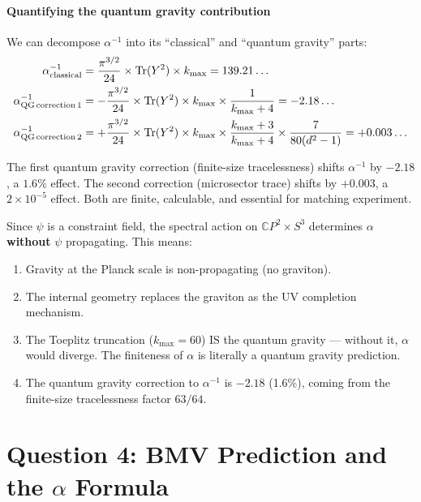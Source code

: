 \documentclass[12pt,a4paper]{article}
\newcommand{\Tr}{\operatorname{Tr}}
\newcommand{\CP}{\mathbb{C}P}
\begin{document}
\subsection{Quantifying the quantum gravity contribution}

We can decompose $\alpha^{-1}$ into its ``classical'' and ``quantum gravity'' parts:
\begin{align}
\alpha^{-1}_{\rm classical} &= \frac{\pi^{3/2}}{24} \times \Tr(Y^2) \times k_{\max} = 139.21\ldots \\
\alpha^{-1}_{\rm QG\,correction\,1} &= -\frac{\pi^{3/2}}{24} \times \Tr(Y^2) \times k_{\max} \times \frac{1}{k_{\max}+4} = -2.18\ldots \\
\alpha^{-1}_{\rm QG\,correction\,2} &= +\frac{\pi^{3/2}}{24} \times \Tr(Y^2) \times k_{\max} \times \frac{k_{\max}+3}{k_{\max}+4} \times \frac{7}{80(d^2-1)} = +0.003\ldots
\end{align}

The first quantum gravity correction (finite-size tracelessness) shifts $\alpha^{-1}$ by $-2.18$, a $1.6\%$ effect. The second correction (microsector trace) shifts by $+0.003$, a $2 \times 10^{-5}$ effect. Both are finite, calculable, and essential for matching experiment.

\begin{tcolorbox}[colback=blue!5!white, colframe=blue!60!black, title=Answer to Question 3]
Since $\psi$ is a constraint field, the spectral action on $\CP^2 \times S^3$ determines $\alpha$ \textbf{without} $\psi$ propagating. This means:
\begin{enumerate}
\item Gravity at the Planck scale is non-propagating (no graviton).
\item The internal geometry replaces the graviton as the UV completion mechanism.
\item The Toeplitz truncation ($k_{\max} = 60$) IS the quantum gravity --- without it, $\alpha$ would diverge. The finiteness of $\alpha$ is literally a quantum gravity prediction.
\item The quantum gravity correction to $\alpha^{-1}$ is $-2.18$ (1.6\%), coming from the finite-size tracelessness factor $63/64$.
\end{enumerate}
\end{tcolorbox}


\part{Question 4: BMV Prediction and the $\alpha$ Formula}
\label{part:q4}
\end{document}
